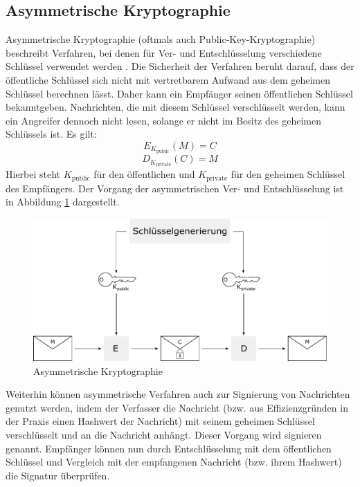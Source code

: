 \subsection{Asymmetrische Kryptographie}

Asymmetrische Kryptographie (oftmals auch Public-Key-Kryptographie) beschreibt Verfahren, bei denen für Ver- und Entschlüsselung verschiedene Schlüssel verwendet werden \cite{Schneier2006}. Die Sicherheit der Verfahren beruht darauf, dass der öffentliche Schlüssel sich nicht mit vertretbarem Aufwand aus dem geheimen Schlüssel berechnen lässt. Daher kann ein Empfänger seinen öffentlichen Schlüssel bekanntgeben. Nachrichten, die mit diesem Schlüssel verschlüsselt werden, kann ein Angreifer dennoch nicht lesen, solange er nicht im Besitz des geheimen Schlüssels ist. Es gilt: 
\[E_{K_{\text{public}}}(M)=C\] 
\[D_{K_{\text{private}}}(C)=M\] 
Hierbei steht \(K_{\text{public}}\) für den öffentlichen und \(K_{\text{private}}\) für den geheimen Schlüssel des Empfängers. Der Vorgang der asymmetrischen Ver- und Entschlüsselung ist in Abbildung \ref{fig_asymmetric_encryption} dargestellt.

\begin{figure}
	\centering
	\includegraphics[width=15cm]{Diagrams/AsymmetricEncryption.pdf} %
	\caption{Asymmetrische Kryptographie}
	\label{fig_asymmetric_encryption}
\end{figure}

Weiterhin können asymmetrische Verfahren auch zur Signierung von Nachrichten genutzt werden, indem der Verfasser die Nachricht (bzw. aus Effizienzgründen in der Praxis einen Hashwert der Nachricht) mit seinem geheimen Schlüssel verschlüsselt und an die Nachricht anhängt. Dieser Vorgang wird signieren genannt. Empfänger können nun durch Entschlüsselung mit dem öffentlichen Schlüssel und Vergleich mit der empfangenen Nachricht (bzw. ihrem Hashwert) die Signatur überprüfen. 

